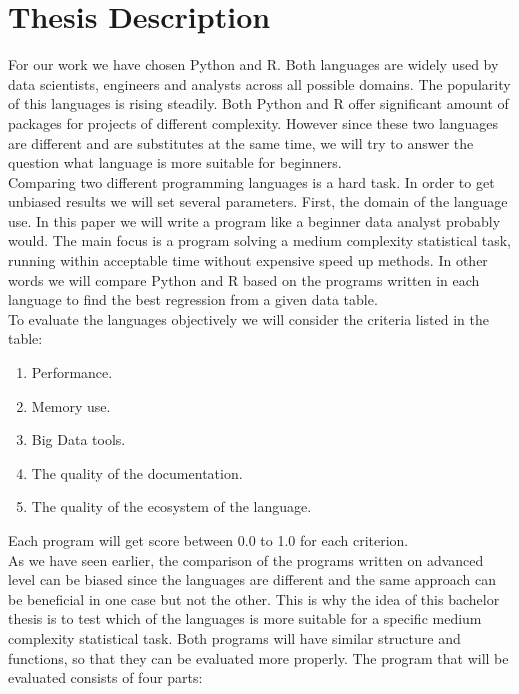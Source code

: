 \documentclass[
  twoside,
  11pt, a4paper,
  footinclude=true,
  headinclude=true,
  cleardoublepage=empty
]{scrreprt}
\begin{document}
    \section{Thesis Description}
    For our work we have chosen Python and R. Both languages are widely used by data scientists, engineers and analysts across all possible domains. The popularity of this languages is rising steadily. Both Python and R offer significant amount of packages for projects of different complexity. However since these two languages are different and are substitutes at the same time, we will try to answer the question what language is more suitable for beginners.\\
    Comparing two different programming languages is a hard task. In order to get unbiased results we will set several parameters. First, the domain of the language use. In this paper we will write a program like a beginner data analyst probably would. The main focus is a program solving a medium complexity statistical task, running within acceptable time without expensive speed up methods. In other words we will compare Python and R based on the programs written in each language to find the best regression from a given data table.\\
    To evaluate the languages objectively we will consider the criteria listed in the table:
    \begin{enumerate}
        \item Performance.
        \item Memory use.
        \item Big Data tools.
        \item The quality of the documentation. 
        \item The quality of the ecosystem of the language.
    \end{enumerate}
    Each program will get score between 0.0 to 1.0 for each criterion. \\
    As we have seen earlier, the comparison of the programs written on advanced level can be biased since the languages are different and the same approach can be beneficial in one case but not the other. This is why the idea of this bachelor thesis is to test which of the languages is more suitable for a specific medium complexity statistical task. Both programs will have similar structure and functions, so that they can be evaluated more properly. The program that will be evaluated consists of four parts:
\end{document}

